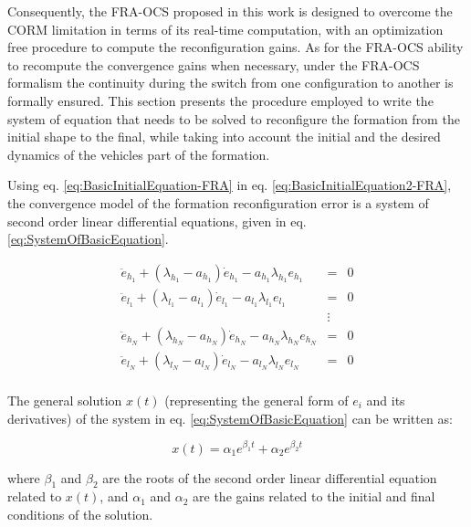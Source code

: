  Consequently, the FRA-OCS proposed in this work is designed to overcome the CORM limitation in terms of its real-time computation, with an optimization free procedure to compute the reconfiguration gains. As for the FRA-OCS ability to recompute the convergence gains when necessary, under the FRA-OCS formalism the continuity during the switch from one configuration to another is formally ensured. This section presents the procedure employed to write the system of equation that needs to be solved to reconfigure the formation from the initial shape to the final, while taking into account the initial and the desired dynamics of the vehicles part of the formation. 

Using eq. \ref{eq:BasicInitialEquation-FRA} in eq. \ref{eq:BasicInitialEquation2-FRA}, the convergence model of the formation reconfiguration error is a system of second order linear differential equations, given in eq. \ref{eq:SystemOfBasicEquation}. 


\begin{eqnarray} \label{eq:SystemOfBasicEquation}
\ddot{e}_{h_{1}} + (\lambda_{h_{1}}-a_{h_{1}}) \dot{e}_{h_{1}} - a_{h_{1}}\lambda_{h_{1}}e_{h_{1}}&=& 0\\ \nonumber
\ddot{e}_{l_{1}} + (\lambda_{l_{1}}-a_{l_{1}}) \dot{e}_{l_{1}} - a_{l_{1}}\lambda_{l_{1}}e_{l_{1}}&=& 0\\ \nonumber
        &\vdots& \\ \nonumber
  \ddot{e}_{h_{N}} + (\lambda_{h_{N}}-a_{h_{N}}) \dot{e}_{h_{N}} - a_{h_{N}}\lambda_{h_{N}}e_{h_{N}}&=& 0\\ \nonumber
  \ddot{e}_{l_{N}} + (\lambda_{l_{N}}-a_{l_{N}}) \dot{e}_{l_{N}} - a_{l_{N}}\lambda_{l_{N}}e_{l_{N}}&=& 0\\ \nonumber
\end{eqnarray}


The general solution $x(t)$ (representing the general form of $e_i$ and its derivatives) of the system in eq. \ref{eq:SystemOfBasicEquation} can be written as: 

\begin{equation}\label{eq:solutionofDFE}
x(t) = \alpha_1 e^{\beta_1t} + \alpha_2 e^{\beta_2 t}   
\end{equation}

\noindent where $\beta_1$ and $\beta_2$ are the roots of the second order linear differential equation related to $x(t)$, and $\alpha_1$ and $\alpha_2$ are the gains related to the initial and final conditions of the solution. 

  
  
